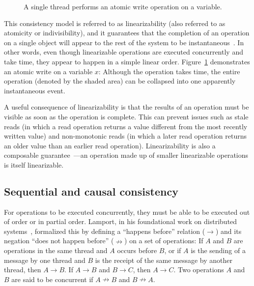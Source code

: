 \documentclass{sig-alternate}
\begin{document}
\begin{figure}[ht]
  \centering
  \resizebox{0.63\linewidth}{!}{}
  \caption{A single thread performs an atomic write operation on a variable.}
\label{figure:linearizability}
\end{figure}

This consistency model is referred to as linearizability (also referred to as atomicity or indivisibility), and it guarantees that the completion of an operation on a single object will appear to the rest of the system to be instantaneous~\cite{Herlihy1990}. In other words, even though linearizable operations are executed concurrently and take time, they appear to happen in a simple linear order. Figure~\ref{figure:linearizability} demonstrates an atomic write on a variable $x$: Although the operation takes time, the entire operation (denoted by the shaded area) can be collapsed into one apparently instantaneous event.

A useful consequence of linearizability is that the results of an operation must be visible as soon as the operation is complete. This can prevent issues such as stale reads (in which a read operation returns a value different from the most recently written value) and non-monotonic reads (in which a later read operation returns an older value than an earlier read operation). Linearizability is also a composable guarantee~\cite{Herlihy1990}---an operation made up of smaller linearizable operations is itself linearizable.

\subsection{Sequential and causal consistency}

For operations to be executed concurrently, they must be able to be executed out of order or in partial order. Lamport, in his foundational work on distributed systems~\cite{Lamport1978}, formalized this by defining a ``happens before'' relation ($\rightarrow$) and its negation ``does not happen before'' ($\nrightarrow$) on a set of operations: If $A$ and $B$ are operations in the same thread and $A$ occurs before $B$, or if $A$ is the sending of a message by one thread and $B$ is the receipt of the same message by another thread, then $A \rightarrow B$. If $A \rightarrow B$ and $B \rightarrow C$, then $A \rightarrow C$. Two operations $A$ and $B$ are said to be concurrent if $A \nrightarrow B$ and $B \nrightarrow A$.
\end{document}
